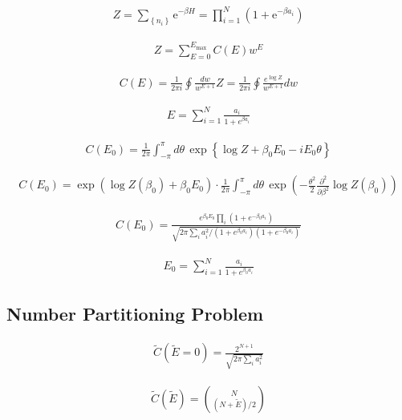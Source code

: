 \documentclass{article}
\begin{document}
\begin{align*}
Z=\sum_{\left\{n_{i}\right\}} \mathrm{e}^{-\beta H}=\prod_{i=1}^{N}\left(1+\mathrm{e}^{-\beta a_{i}}\right) 
\tag{9.5}
\end{align*}

\begin{align*}
Z = \sum_{E=0}^{E_{\text{max}}} C(E) w^E \tag{9.6}
\end{align*}

\begin{align*}
C(E) = \frac{1}{2\pi i} \oint \frac{dw}{w^{E+1}} Z = \frac{1}{2\pi i} \oint \frac{e^{\log Z}}{w^{E+1}} dw \tag{9.7}
\end{align*}

\begin{align*}
E = \sum_{i=1}^{N} \frac{a_i}{1 + e^{\beta a_i}} \tag{9.8}
\end{align*}

\begin{align*}
C(E_0) = \frac{1}{2\pi} \int_{-\pi}^{\pi} d\theta \, \exp \left \{\log Z + \beta_0 E_0 - i E_0 \theta \right\} \tag{9.9}
\end{align*}

\begin{align*}
C(E_0) = \exp \left( \log Z(\beta_0) + \beta_0 E_0 \right) \cdot \frac{1}{2\pi} \int_{-\pi}^{\pi} d\theta \, \exp \left( -\frac{\theta^2}{2} \frac{\partial^2}{\partial \beta^2} \log Z (\beta_0) \right) \tag{9.10}
\end{align*}

\begin{align*}
C(E_0) = \frac{e^{\beta_0 E_0} \prod_{i} \left( 1 + e^{-\beta_0 a_i} \right)}{\sqrt{2\pi \sum_{i} a_i^2 / \left( 1 + e^{\beta_0 a_i} \right) \left( 1 + e^{-\beta_0 a_i} \right)}} \tag{9.11}
\end{align*}

\begin{align*}
E_0 = \sum_{i=1}^{N} \frac{a_i}{1 + e^{\beta_0 a_i}} \tag{9.12}
\end{align*}

\subsection{Number Partitioning Problem}

\begin{align*}
\tilde{C}(\tilde{E} = 0) = \frac{2^{N+1}}{\sqrt{2\pi \sum_{i} a_i^2}} \tag{9.13}
\end{align*}

\begin{align*}
\tilde{C}(\tilde{E}) = \binom{N}{(N + \tilde{E}) / 2} \tag{9.14}
\end{align*}
\end{document}
